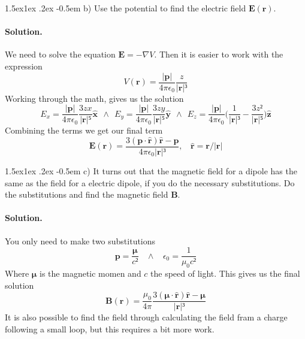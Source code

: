 \documentclass[%
oneside,                 %
final,                   %
10pt]{article}
\makeatletter
\newenvironment{doconceexercise}{}{}
\newcommand\subex{\@startsection{paragraph}{4}{\z@}%
                  {1.5ex\@plus1ex \@minus.2ex}%
                  {-0.5em}%
                  {\normalfont\normalsize\bfseries}}
\makeatother
\begin{document}
\begin{doconceexercise}

\subex{b)}
Use the potential to find the electric field $\mathbf{E}(\mathbf{r})$.


\paragraph{Solution.}
We need to solve the equation $\mathbf{E}=-\nabla V$. Then it is easier to work with the expression
\begin{equation}
V(\mathbf{r}) = \frac{|\mathbf{p}|}{4\pi\epsilon_0}\frac{z}{|\mathbf{r}|³}
\end{equation}
Working through the math, gives us the solution
\begin{equation}
E_x = \frac{|\mathbf{p}|}{4\pi\epsilon_0}\frac{3zx}{|\mathbf{r}|⁵}\mathbf{\hat{x}} \ \ \wedge \ \ E_y = \frac{|\mathbf{p}|}{4\pi\epsilon_0}\frac{3zy}{|\mathbf{r}|⁵}\mathbf{\hat{y}} \ \ \wedge \ \ E_z = \frac{|\mathbf{p}|}{4\pi\epsilon_0}\bigg(\frac{1}{|\mathbf{r}|³} - \frac{3z²}{|\mathbf{r}|⁵}\bigg)\mathbf{\hat{z}}
\end{equation}
Combining the terms we get our final term
\begin{equation}
\mathbf{E}(\mathbf{r}) = \frac{3(\mathbf{p}\cdot \mathbf{\hat{r}})\mathbf{\hat{r}} - \mathbf{p}}{4\pi\epsilon_0|\mathbf{r}|³}, \ \ \ \ \mathbf{\hat{r}} = \mathbf{r}/|\mathbf{r}|
\end{equation}


\subex{c)}
It turns out that the magnetic field for a dipole has the same as the field for a electric dipole, if you do the necessary substitutions. Do the substitutions and find the magnetic field $\mathbf{B}$.


\paragraph{Solution.}
You only need to make two substitutions
\begin{equation}
\mathbf{p} = \frac{\bm{\mu}}{c²} \ \ \ \ \wedge \ \ \ \ \epsilon_0 = \frac{1}{\mu_0 c²}
\end{equation}
Where $\bm\mu$ is the magnetic momen and $c$ the speed of light. This gives us the final solution
\begin{equation}
\mathbf{B}(\mathbf{r}) = \frac{\mu_0}{4\pi}\frac{3(\bm{\mu}\cdot\mathbf{\hat{r}})\mathbf{\hat{r}} - \bm{\mu}}{|\mathbf{r}|³}
\end{equation}
It is also possible to find the field through calculating the field fram a charge following a small loop, but this requires a bit more work.









\end{doconceexercise}



\end{document}
